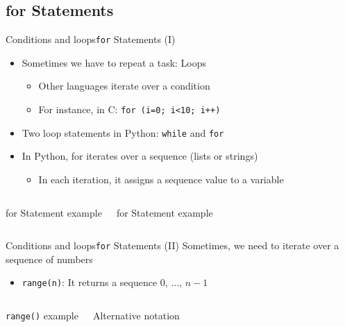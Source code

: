 \documentclass[10pt,compress]{beamer} %
\begin{document}
\subsection{for Statements}
\begin{frame}{Conditions and loops}{\texttt{for} Statements (I)}
	\begin{itemize}
		\item Sometimes we have to repeat a task: Loops
			\begin{itemize}
			\item Other languages iterate over a condition
			\item For instance, in C: \texttt{for (i=0; i<10; i++)}
			\end{itemize}
		\item Two loop statements in Python: \texttt{while} and \texttt{for}
		\item In Python, for iterates over a sequence (lists or strings)
			\begin{itemize}
			\item In each iteration, it assigns a sequence value to a variable
			\end{itemize}
	\end{itemize}

    \begin{columns}
		\begin{block}{for Statement example}
		
		\end{block}


		\begin{block}{for Statement example}
		
		\end{block}
	\end{columns}
\end{frame}

\begin{frame}{Conditions and loops}{\texttt{for} Statements (II)}
	Sometimes, we need to iterate over a sequence of numbers
	\begin{itemize}
		\item \texttt{range(n)}: It returns a sequence $0$, ..., $n-1$
	\end{itemize}

    \begin{columns}
		\begin{block}{\texttt{range()} example}
		
		\end{block}
		
		\begin{block}{Alternative notation}
		
		\end{block}
	\end{columns}
\end{frame}
\end{document}
